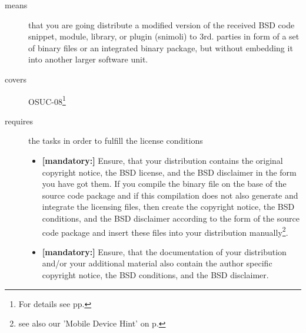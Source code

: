 \begin{description}
\item[means] that you are going distribute a modified version of the received
BSD code snippet, module, library, or plugin (snimoli) to 3rd. parties in form
of a set of binary files or an integrated binary package, but without embedding
it into another larger software unit.
\item[covers] OSUC-08\footnote{For details see pp. \pageref{OSUC-08-DEF}}
\item[requires] the tasks in order to fulfill the license conditions
\begin{itemize}
   \item  \textbf{[mandatory:]} Ensure, that your distribution contains the
  original copyright notice, the BSD license, and the BSD disclaimer in the form
  you have got them. If you compile the binary file on the base of the source
  code package and if this compilation does not also generate and integrate the
  licensing files, then create the copyright notice, the BSD conditions, and the
  BSD disclaimer according to the form of the source code package and insert
  these files into your distribution manually\footnote{see also our 'Mobile
  Device Hint' on p. \pageref{MobileDeviceHint}}.
  \item  \textbf{[mandatory:]} Ensure, that the documentation of your
  distribution and/or your additional material also contain the author specific
  copyright notice, the BSD conditions, and the BSD disclaimer.
\end{itemize}
\end{description}

